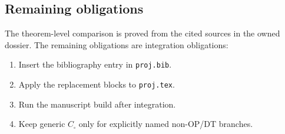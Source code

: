 \subsection{Remaining obligations}

The theorem-level comparison is proved from the cited sources in the
owned dossier.  The remaining obligations are integration obligations:
\begin{enumerate}
\item Insert the bibliography entry in \texttt{proj.bib}.
\item Apply the replacement blocks to \texttt{proj.tex}.
\item Run the manuscript build after integration.
\item Keep generic \(C_{\square}\) only for explicitly named non-OP/DT
branches.
\end{enumerate}
